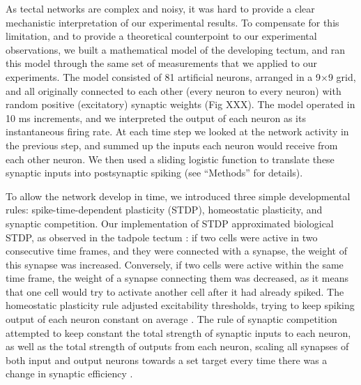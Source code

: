 \documentclass{article}
\begin{document}
As tectal networks are complex and noisy, it was hard to provide a clear mechanistic interpretation of our experimental results. To compensate for this limitation, and to provide a theoretical counterpoint to our experimental observations, we built a mathematical model of the developing tectum, and ran this model through the same set of measurements that we applied to our experiments. The model consisted of 81 artificial neurons, arranged in a 9$\times$9 grid, and all originally connected to each other (every neuron to every neuron) with random positive (excitatory) synaptic weights (Fig XXX). The model operated in 10 ms increments, and we interpreted the output of each neuron as its instantaneous firing rate. At each time step we looked at the network activity in the previous step, and summed up the inputs each neuron would receive from each other neuron. We then used a sliding logistic function to translate these synaptic inputs into postsynaptic spiking (see “Methods” for details).

To allow the network develop in time, we introduced three simple developmental rules: spike-time-dependent plasticity (STDP), homeostatic plasticity, and synaptic competition. Our implementation of STDP approximated biological STDP, as observed in the tadpole tectum \citep{zhang1998stdp,mu2006stdp}: if two cells were active in two consecutive time frames, and they were connected with a synapse, the weight of this synapse was increased. Conversely, if two cells were active within the same time frame, the weight of a synapse connecting them was decreased, as it means that one cell would try to activate another cell after it had already spiked. The homeostatic plasticity rule adjusted excitability thresholds, trying to keep spiking output of each neuron constant on average \citep{pratt2007intrinsic,turrigiano2011}. The rule of synaptic competition attempted to keep constant the total strength of synaptic inputs to each neuron, as well as the total strength of outputs from each neuron, scaling all synapses of both input and output neurons towards a set target every time there was a change in synaptic efficiency \citep{hamodi2016nmda,cohen2002synreview,munz2014hebbian}.
\end{document}
